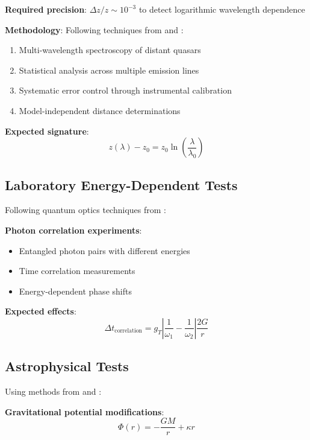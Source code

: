 \documentclass[12pt,a4paper]{article}
\begin{document}
	\textbf{Required precision}: $\Delta z/z \sim 10^{-3}$ to detect logarithmic wavelength dependence
	
	\textbf{Methodology}: Following techniques from \citet{murphy2003} and \citet{uzan2003}:
	\begin{enumerate}
		\item Multi-wavelength spectroscopy of distant quasars
		\item Statistical analysis across multiple emission lines
		\item Systematic error control through instrumental calibration
		\item Model-independent distance determinations
	\end{enumerate}
	
	\textbf{Expected signature}: 
	\begin{equation}
		z(\lambda) - z_0 = z_0 \ln\left(\frac{\lambda}{\lambda_0}\right)
	\end{equation}
	
	\subsection{Laboratory Energy-Dependent Tests}
	\label{app:laboratory_tests}
	
	Following quantum optics techniques from \citet{scully1997}:
	
	\textbf{Photon correlation experiments}:
	\begin{itemize}
		\item Entangled photon pairs with different energies
		\item Time correlation measurements
		\item Energy-dependent phase shifts
	\end{itemize}
	
	\textbf{Expected effects}:
	\begin{equation}
		\Delta t_{\text{correlation}} = g_T \left|\frac{1}{\omega_1} - \frac{1}{\omega_2}\right| \frac{2G}{r}
	\end{equation}
	
	\subsection{Astrophysical Tests}
	\label{app:astrophysical_tests}
	
	Using methods from \citet{will2014} and \citet{binney2008}:
	
	\textbf{Gravitational potential modifications}:
	\begin{equation}
		\Phi(r) = -\frac{GM}{r} + \kappa r
	\end{equation}
	
\end{document}
